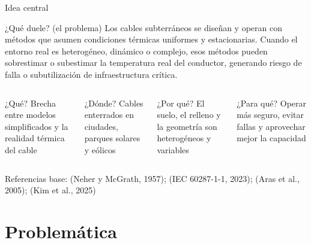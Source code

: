 \documentclass[aspectratio=169]{beamer}
\newcommand{\refcite}[1]{{\footnotesize\color{gray!70!black} #1}}
\begin{document}
\begin{frame}{Idea central}
\justifying

\begin{alertblock}{¿Qué duele? (el problema)}
Los cables subterráneos se diseñan y operan con métodos que asumen condiciones
térmicas uniformes y estacionarias. Cuando el entorno real es heterogéneo,
dinámico o complejo, esos métodos pueden sobrestimar o subestimar la
temperatura real del conductor, generando riesgo de falla o subutilización
de infraestructura crítica.
\end{alertblock}

\vspace{0.5em}
\begin{columns}[T]
\begin{block}{\small¿Qué?}
\tiny Brecha entre modelos simplificados y la realidad térmica del cable
\end{block}
\begin{block}{\small¿Dónde?}
\tiny Cables enterrados en ciudades, parques solares y eólicos
\end{block}
\begin{block}{\small¿Por qué?}
\tiny El suelo, el relleno y la geometría son heterogéneos y variables
\end{block}
\begin{block}{\small¿Para qué?}
\tiny Operar más seguro, evitar fallas y aprovechar mejor la capacidad
\end{block}
\end{columns}

\vspace{0.4em}
\refcite{Referencias base: (Neher y McGrath, 1957); (IEC 60287-1-1, 2023);
(Aras et al., 2005); (Kim et al., 2025)}
\end{frame}


\section{Problemática}
\end{document}
